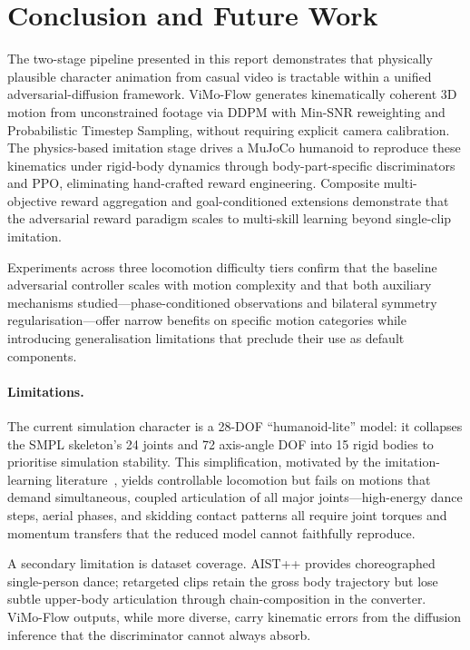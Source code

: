 \section{Conclusion and Future Work}
\label{sec:conclusion}

The two-stage pipeline presented in this report demonstrates that physically plausible character animation from casual video is tractable within a unified adversarial-diffusion framework. ViMo-Flow generates kinematically coherent 3D motion from unconstrained footage via DDPM with Min-SNR reweighting and Probabilistic Timestep Sampling, without requiring explicit camera calibration. The physics-based imitation stage drives a MuJoCo humanoid to reproduce these kinematics under rigid-body dynamics through body-part-specific discriminators and PPO, eliminating hand-crafted reward engineering. Composite multi-objective reward aggregation and goal-conditioned extensions demonstrate that the adversarial reward paradigm scales to multi-skill learning beyond single-clip imitation.

Experiments across three locomotion difficulty tiers confirm that the baseline adversarial controller scales with motion complexity and that both auxiliary mechanisms studied---phase-conditioned observations and bilateral symmetry regularisation---offer narrow benefits on specific motion categories while introducing generalisation limitations that preclude their use as default components.

\paragraph{Limitations.}
The current simulation character is a 28-DOF ``humanoid-lite'' model: it collapses the SMPL skeleton's 24 joints and 72 axis-angle DOF into 15 rigid bodies to prioritise simulation stability. This simplification, motivated by the imitation-learning literature~\cite{deepmimic2018, iccgan2021}, yields controllable locomotion but fails on motions that demand simultaneous, coupled articulation of all major joints---high-energy dance steps, aerial phases, and skidding contact patterns all require joint torques and momentum transfers that the reduced model cannot faithfully reproduce.

A secondary limitation is dataset coverage. AIST++ provides choreographed single-person dance; retargeted clips retain the gross body trajectory but lose subtle upper-body articulation through chain-composition in the converter. ViMo-Flow outputs, while more diverse, carry kinematic errors from the diffusion inference that the discriminator cannot always absorb.

